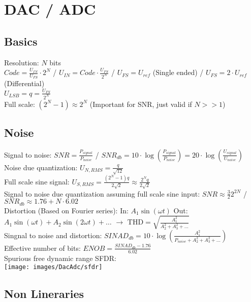 \section{DAC / ADC}

\subsection{Basics}
Resolution: $N$ bits \\
$Code = \frac{U_{IN}}{U_{FS}} \cdot 2^N$ / $U_{IN} = Code \cdot \frac{U_{FS}}{2^N}$ / $U_{FS} = U_{ref}$ (Single ended) / $U_{FS} = 2 \cdot U_{ref}$ (Differential)\\
$U_{LSB} = q = \frac{U_{FS}}{2^N}$\\
Full scale: $(2^N-1) \approx 2^N$ (Important for SNR, just valid if $N>>1$)

\subsection{Noise}
Signal to noise: $SNR = \frac{P_{signal}}{P_{noise}}$ / $SNR_{db} = 10 \cdot \log(\frac{P_{signal}}{P_{noise}}) = 20 \cdot \log(\frac{U_{signal}}{U_{noise}})$\\
Noise due quantization: $U_{N,RMS} = \frac{q}{\sqrt{12}}$ \\
Full scale sine signal: $U_{S,RMS} = \frac{(2^N-1) q}{2\sqrt{2}} \approx \frac{2^N q}{2 \sqrt{2}}$ \\
Signal to noise due quantization assuming full scale sine input: $SNR \approx \frac{3}{2} 2^{2N}$ / $SNR_{db} \approx 1.76 + N \cdot 6.02$\\
Distortion (Based on Fourier series): In: $A_1 \sin(\omega t)$ Out: $A_1 \sin(\omega t) + A_2 \sin(2 \omega t) + \hdots$ $\rightarrow$ $\text{THD} = \sqrt{\frac{A_1^2}{A_2^2 + A_3^2 + \hdots}}$\\
Singnal to noise and distortion: $SINAD_{db} = 10 \cdot \log\left(\frac{A_1^2}{P_{noise} + A_2^2 + A_3^2 + \hdots}\right)$\\
Effective number of bits: $ENOB = \frac{SINAD_{db} - 1.76}{6.02}$\\
Spurious free dynamic range SFDR:\\
\texttt{[image: images/DacAdc/sfdr]}

\subsection{Non Lineraries}

